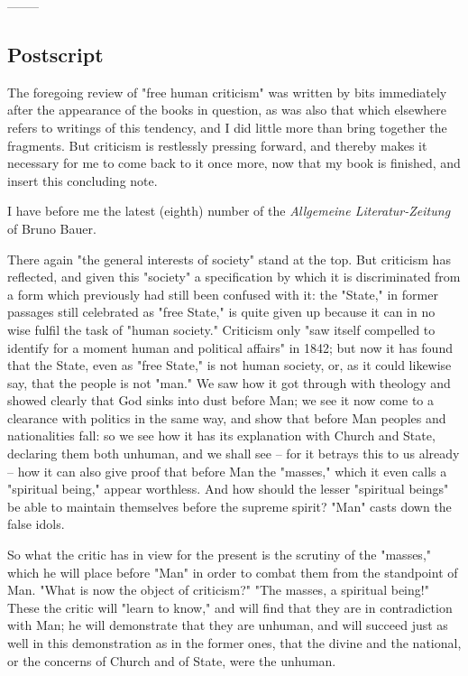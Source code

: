 \documentclass[a4paper]{book}
\begin{document}
\begin{center}
--------\end{center}


\subsection[Postscript]{\centering Postscript}

The foregoing review of "{}free human criticism"{} was written by bits 
immediately after the appearance of the books in question, as was also that 
which elsewhere refers to writings of this tendency, and I did little more 
than bring together the fragments. But criticism is restlessly pressing 
forward, and thereby makes it necessary for me to come back to it once more, 
now that my book is finished, and insert this concluding note.

I have before me the latest (eighth) number of the \textit{Allgemeine 
Literatur-Zeitung} of Bruno Bauer.

There again "{}the general interests of society"{} stand at the top. But 
criticism has reflected, and given this "{}society"{} a specification by which 
it is discriminated from a form which previously had still been confused with 
it: the "{}State,"{} in former passages still celebrated as "{}free State,"{} 
is quite given up because it can in no wise fulfil the task of "{}human 
society."{} Criticism only "{}saw itself compelled to identify for a moment 
human and political affairs"{} in 1842; but now it has found that the State, 
even as "{}free State,"{} is not human society, or, as it could likewise say, 
that the people is not "{}man."{} We saw how it got through with theology and 
showed clearly that God sinks into dust before Man; we see it now come to a 
clearance with politics in the same way, and show that before Man peoples and 
nationalities fall: so we see how it has its explanation with Church and 
State, declaring them both unhuman, and we shall see -- for it betrays this to 
us already -- how it can also give proof that before Man the "{}masses,"{} 
which it even calls a "{}spiritual being,"{} appear worthless. And how should 
the lesser "{}spiritual beings"{} be able to maintain themselves before the 
supreme spirit? "{}Man"{} casts down the false idols.

So what the critic has in view for the present is the scrutiny of the 
"{}masses,"{} which he will place before "{}Man"{} in order to combat them 
from the standpoint of Man. "{}What is now the object of criticism?"{} "{}The 
masses, a spiritual being!"{} These the critic will "{}learn to know,"{} and 
will find that they are in contradiction with Man; he will demonstrate that 
they are unhuman, and will succeed just as well in this demonstration as in 
the former ones, that the divine and the national, or the concerns of Church 
and of State, were the unhuman.
\end{document}

